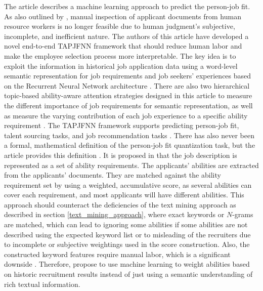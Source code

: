 \documentclass[draft,final]{thesisclass} %
\begin{document}
The article \textcite{pj_fit_ml} describes a machine learning approach to predict the person-job fit.
As also outlined by \textcite[1]{pj_fit_ml}, manual inspection of applicant documents from human resource workers is no longer feasible due to human judgment's subjective, incomplete, and inefficient nature.
The authors of this article have developed a novel end-to-end \gls{TAPJFNN} framework that should reduce human labor and make the employee selection process more interpretable.
The key idea is to exploit the information in historical job application data using a word-level semantic representation for job requirements and job seekers' experiences based on the Recurrent Neural Network architecture \parencite[1]{pj_fit_ml}.
There are also two hierarchical topic-based ability-aware attention strategies designed in this article to measure the different importance of job requirements for semantic representation, as well as measure the varying contribution of each job experience to a specific ability requirement \parencite[1]{pj_fit_ml}.
The \acs{TAPJFNN} framework supports predicting person-job fit, talent sourcing tasks, and job recommendation tasks \parencite[1]{pj_fit_ml}.
There has also never been a formal, mathematical definition of the person-job fit quantization task, but the article \textcite{pj_fit_ml} provides this definition \parencite[2]{pj_fit_ml}.
It is proposed in \textcite[2]{pj_fit_ml} that the job description is represented as a set of ability requirements.
The applicants' abilities are extracted from the applicants' documents. They are matched against the ability requirement set by using a weighted, accumulative score, as several abilities can cover each requirement, and most applicants will have different abilities. 
This approach should counteract the deficiencies of the text mining approach as described in section \ref{text_mining_approach}, where exact keywords or $N$-grams are matched, which can lead to ignoring some abilities if some abilities are not described using the expected keyword list or to misleading of the recruiters due to incomplete or subjective weightings used in the score construction.
Also, the constructed keyword features require manual labor, which is a significant downside \parencite[5]{pj_fit_ml}.
Therefore, \textcite[2]{pj_fit_ml} propose to use machine learning to weight abilities based on historic recruitment results instead of just using a semantic understanding of rich textual information.
\end{document}
